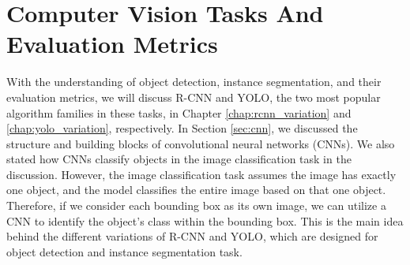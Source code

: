 \chapter{Computer Vision Tasks And Evaluation Metrics} \label{chap:segmentation_metric}





With the understanding of object detection, instance segmentation, and their evaluation metrics, we will discuss R-CNN and YOLO, the two most popular algorithm families in these tasks, in Chapter \ref{chap:rcnn_variation} and \ref{chap:yolo_variation}, respectively. In Section \ref{sec:cnn}, we discussed the structure and building blocks of convolutional neural networks (CNNs). We also stated how CNNs classify objects in the image classification task in the discussion. However,  the image classification task assumes the image has exactly one object, and the model classifies the entire image based on that one object. Therefore, if we consider each bounding box as its own image, we can utilize a CNN to identify the object's class within the bounding box. This is the main idea behind the different variations of R-CNN and YOLO, which are designed for object detection and instance segmentation task. 